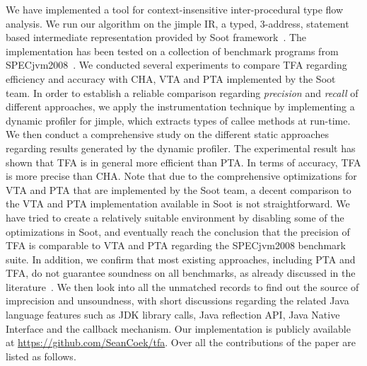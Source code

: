 \documentclass{fac}
\begin{document}
We have implemented a tool for context-insensitive inter-procedural type flow analysis. %
We run our algorithm on the jimple IR, a typed, 3-address, statement based intermediate representation provided by Soot framework~\cite{soot}. The implementation has been tested on a collection of benchmark programs from SPECjvm2008~\cite{specjvm}. We conducted several experiments to compare TFA regarding efficiency and accuracy with CHA, VTA and PTA implemented by the Soot team. In order to establish a reliable comparison regarding \emph{precision} and \emph{recall} of different approaches, we apply the instrumentation technique by implementing a dynamic profiler for jimple, which extracts types of callee methods at run-time. We then conduct a comprehensive study on the different static approaches regarding results generated by the dynamic profiler. The experimental result has shown that TFA is in general more efficient than PTA. In terms of accuracy, TFA is more precise than CHA. Note that due to the comprehensive optimizations for VTA and PTA that are implemented by the Soot team, a decent comparison to the VTA and PTA implementation available in Soot is not straightforward. We have tried to create a relatively suitable environment by disabling some of the optimizations in Soot, and eventually reach the conclusion that the precision of TFA is comparable to VTA and PTA regarding the SPECjvm2008 benchmark suite. In addition, we confirm that most existing approaches, including PTA and TFA, do not guarantee soundness on all benchmarks, as already discussed in the literature~\cite{LivshitsSSLACGKMV15}. We then look into all the unmatched records to find out the source of imprecision and unsoundness, with short discussions regarding the related Java language features such as JDK library calls, Java reflection API, Java Native Interface and the callback mechanism. %
Our implementation is publicly available at \url{https://github.com/SeanCoek/tfa}.
%
Over all the contributions of the paper are listed as follows.
\end{document}
